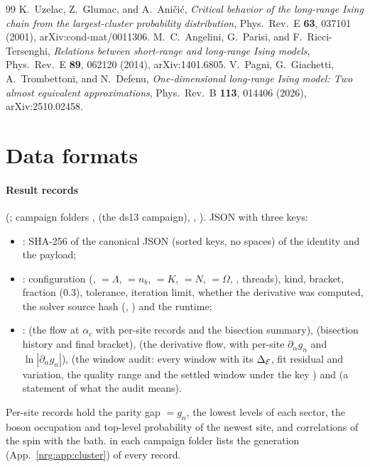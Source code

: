 \begin{thebibliography}{99}
 K.~Uzelac, Z.~Glumac, and A.~Ani\v{c}i\'c, \emph{Critical behavior of the long-range Ising chain from the
  largest-cluster probability distribution}, Phys.\ Rev.\ E \textbf{63}, 037101 (2001), arXiv:cond-mat/0011306.
 M.~C.~Angelini, G.~Parisi, and F.~Ricci-Tersenghi, \emph{Relations between short-range and long-range Ising models},
  Phys.\ Rev.\ E \textbf{89}, 062120 (2014), arXiv:1401.6805.
 V.~Pagni, G.~Giachetti, A.~Trombettoni, and N.~Defenu, \emph{One-dimensional long-range Ising model: Two almost
  equivalent approximations}, Phys.\ Rev.\ B \textbf{113}, 014406 (2026), arXiv:2510.02458.
\end{thebibliography}

\appendix
\section{Data formats}\label{nrg:app:formats}
\paragraph{Result records} (; campaign folders ,  (the
ds13 campaign), , ). JSON with three keys:
\begin{itemize}
\item {}: SHA-256 of the canonical JSON (sorted keys, no spaces) of the identity and the payload;
\item {}: configuration (,  $=\Lambda$,  $=n_b$,  $=K$,  $=N$,
   $=\Omega$, , threads), kind, bracket, fraction (0.3), tolerance, iteration limit, whether the
  derivative was computed, the solver source hash (, ) and the runtime;
\item {}:  (the flow at $\alpha_c$ with per-site records and the bisection summary), 
  (bisection history and final bracket),  (the derivative flow, with per-site $\partial_\alpha g_n$ and
  $\ln|\partial_\alpha g_n|$),  (the window audit: every window with its $\Delta_{\mathcal E}$, fit residual and variation, the quality
  range and the settled window under the key ) and  (a statement of what the audit means).
\end{itemize}
Per-site records hold the parity gap  $=g_n$, the lowest levels of each sector, the boson occupation and top-level
probability of the newest site, and correlations of the spin with the bath.  in each campaign folder lists the
generation (App.~\ref{nrg:app:cluster}) of every record.

